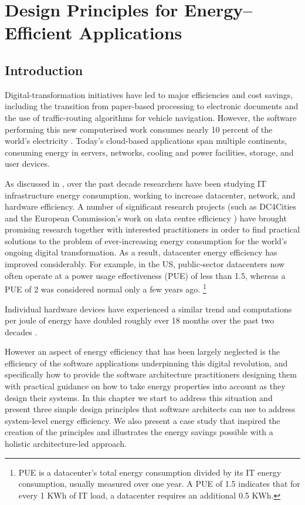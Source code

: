 \chapter{Design Principles for Energy--Efficient Applications}
\label{chapter:energydesignprinciples}

\section{Introduction}

Digital-transformation initiatives have led to major efficiencies and cost savings, including the transition from paper-based processing to electronic documents and the use of traffic-routing algorithms for vehicle navigation. However, the software performing this new computerised work consumes nearly 10 percent of the world's electricity \cite{mills2013-digital-energyusage}. Today's cloud-based applications span multiple continents, consuming energy in servers, networks, cooling and power facilities, storage, and user devices.

As discussed in , over the past decade researchers have been studying IT infrastructure energy consumption, working to increase datacenter, network, and hardware efficiency. A number of significant research projects (such as DC4Cities \cite{dc4cities2014_dcmetrics} and the European Commission's work on data centre efficiency \cite{eu2018-datacentreenergy}) have brought promising research together with interested practitioners in order to find practical solutions to the problem of ever-increasing energy consumption for the world's ongoing digital transformation.  As a result, datacenter energy efficiency has improved considerably. For example, in the US, public-sector datacenters now often operate at a power usage effectiveness (PUE) of less than 1.5, whereas a PUE of 2 was considered normal only a few years ago. \footnote{PUE is a datacenter's total energy consumption divided by its IT energy consumption, usually measured over one year. A PUE of 1.5 indicates that for every 1 KWh of IT load, a datacenter requires an additional 0.5 KWh.}

Individual hardware devices have experienced a similar trend and computations per joule of energy have doubled roughly ever 18 months over the past two decades \cite{koomey2011-trends-energy-efficiency}. 

However an aspect of energy efficiency that has been largely neglected is the efficiency of the software applications underpinning this digital revolution, and specifically how to provide the software architecture practitioners designing them with practical guidance on how to take energy properties into account as they design their systems.  In this chapter we start to address this situation and present three simple design principles that software architects can use to address system-level energy efficiency. We also present a case study that inspired the creation of the principles and illustrates the energy savings possible with a holistic architecture-led approach.

